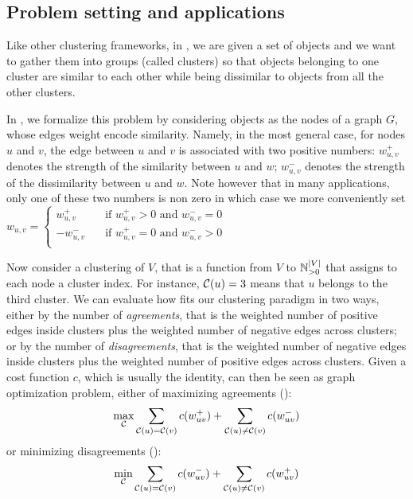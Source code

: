 \subsection{Problem setting and applications}
\label{sub:problem_setting}

Like other clustering frameworks, in \pcc{}, we are given a set of objects and we want to gather
them into groups (called clusters) so that objects belonging to one cluster are similar to each
other while being dissimilar to objects from all the other clusters.

In \pcc{}, we formalize this problem by considering objects as the nodes of a graph $G$, whose edges
weight encode similarity. Namely, in the most general case, for nodes $u$ and $v$, the edge between
$u$ and $v$ is associated with two positive numbers:
$w_{u,v}^+$ denotes the strength of the similarity between $u$ and $w$;
$w_{u,v}^-$ denotes the strength of the dissimilarity between $u$ and $w$.
Note however that in many applications, only one of these two numbers is non zero in which case we
more conveniently set $w_{u,v} = \begin{cases}
	 w_{u,v}^+ & \quad \text{if } w_{u,v}^+ > 0 \text{ and } w_{u,v}^-=0 \\
	-w_{u,v}^- & \quad \text{if } w_{u,v}^+ = 0 \text{ and } w_{u,v}^->0 \\
\end{cases}$

Now consider a clustering \cluster{} of $V$, that is a function from $V$ to $\mathbb{N}{}^{|V|}_{>0}$
that assigns to each node a cluster index. For instance, $\mathcal{C}(u) = 3$ means that $u$ belongs
to the third cluster. We can evaluate how \cluster{} fits our clustering paradigm in two ways,
either by the number of \emph{agreements}, that is the weighted number of positive edges inside
clusters plus the weighted number of negative edges across clusters; or by the number of
\emph{disagreements}, that is the weighted number of negative edges inside clusters plus the
weighted number of positive edges across clusters. Given a cost function $c$, which is usually the
identity, \pcc{} can then be seen as graph optimization problem, either of maximizing agreements
(\maxa{}):
\begin{equation}
	\max_{\mathcal{C}{}} \sum_{\mathcal{C}(u) = \mathcal{C}(v)} c(w_{uv}^+) +
	\sum_{\mathcal{C}(u) \neq \mathcal{C}(v)} c(w_{uv}^-)
	\label{eq:maxa}
\end{equation}
or minimizing disagreements (\mind{}):
\begin{equation}
	\min_{\mathcal{C}{}} \sum_{\mathcal{C}(u) = \mathcal{C}(v)} c(w_{uv}^-) +
	\sum_{\mathcal{C}(u) \neq \mathcal{C}(v)} c(w_{uv}^+)
	\label{eq:mind}
\end{equation}

